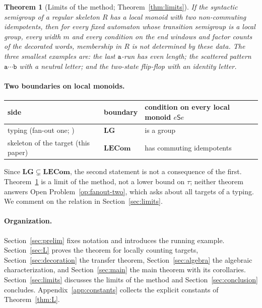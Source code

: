 \documentclass[11pt]{article}
\numberwithin{equation}{section}
\theoremstyle{plain}
\theoremstyle{definition}
\theoremstyle{remark}
\theoremstyle{plain}
\newtheorem{mainthm}{Theorem}
\newcommand{\LG}{\mathbf{LG}}
\newcommand{\LECom}{\mathbf{L}\mathbf{ECom}}
\begin{document}
\setcounter{mainthm}{3}%
\begin{mainthm}[Limits of the method; Theorem~\ref{thm:limits}]
\label{thm:D}
If the syntactic semigroup of a regular skeleton $R$ has a local monoid with
two non-commuting idempotents, then for every fixed automaton whose transition
semigroup is a local group, every width $m$ and every condition on the end
windows and factor counts of the decorated words, membership in $R$ is not
determined by these data.  The three smallest examples are: the last
$\mathtt a$-run has even length; the scattered pattern $\mathtt a\cdots\mathtt b$
with a neutral letter; and the two-state flip-flop with an identity letter.
\end{mainthm}

\paragraph{Two boundaries on local monoids.}
\begin{center}
\begin{tabular}{lll}
\toprule
side & boundary & condition on every local monoid $e\mathsf Se$\\
\midrule
typing (fan-out one; \cite{KuriyamaTCS1,KuriyamaTypingClass}) & $\LG$ & is a group\\
skeleton of the target (this paper) & $\LECom$ & has commuting idempotents\\
\bottomrule
\end{tabular}
\end{center}
Since $\LG\subsetneq\LECom$, the second statement is not a consequence of the
first.  Theorem~\ref{thm:D} is a limit of the method, not a lower bound on
$\tau$; neither theorem answers Open Problem~\ref{op:fanout-two}, which asks
about all targets of a typing.  We comment on the relation in
Section~\ref{sec:limits}.

\paragraph{Organization.}
Section~\ref{sec:prelim} fixes notation and introduces the running example.
Section~\ref{sec:L} proves the theorem for locally counting targets,
Section~\ref{sec:decoration} the transfer theorem, Section~\ref{sec:algebra}
the algebraic characterization, and Section~\ref{sec:main} the main theorem
with its corollaries.  Section~\ref{sec:limits} discusses the limits of the
method and Section~\ref{sec:conclusion} concludes.  Appendix~\ref{app:constants}
collects the explicit constants of Theorem~\ref{thm:L}.
\end{document}
